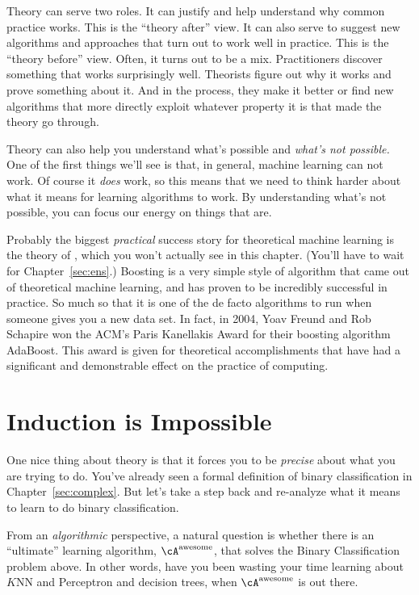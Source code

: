 Theory can serve two roles.  It can justify and help understand why
common practice works.  This is the ``theory after'' view.  It can
also serve to suggest new algorithms and approaches that turn out to
work well in practice.  This is the ``theory before'' view.  Often, it
turns out to be a mix.  Practitioners discover something that works
surprisingly well.  Theorists figure out why it works and prove
something about it.  And in the process, they make it better or find
new algorithms that more directly exploit whatever property it is that
made the theory go through.

Theory can also help you understand what's possible and \emph{what's
  not possible.}  One of the first things we'll see is that, in
general, machine learning can not work.  Of course it \emph{does}
work, so this means that we need to think harder about what it means
for learning algorithms to work.  By understanding what's not
possible, you can focus our energy on things that are.

Probably the biggest \emph{practical} success story for theoretical
machine learning is the theory of , which you won't
actually see in this chapter.  (You'll have to wait for
Chapter~\ref{sec:ens}.)  Boosting is a very simple style of algorithm
that came out of theoretical machine learning, and has proven to be
incredibly successful in practice.  So much so that it is one of the
de facto algorithms to run when someone gives you a new data set.  In
fact, in 2004, Yoav Freund and Rob Schapire won the ACM's Paris
Kanellakis Award for their boosting algorithm AdaBoost.  This award is
given for theoretical accomplishments that have had a significant and
demonstrable effect on the practice of computing.

\section{Induction is Impossible}

One nice thing about theory is that it forces you to be \emph{precise}
about what you are trying to do.  You've already seen a formal
definition of binary classification in Chapter~\ref{sec:complex}.  But
let's take a step back and re-analyze what it means to learn to do
binary classification.

From an \emph{algorithmic} perspective, a natural question is whether
there is an ``ultimate'' learning algorithm, $\cA^{\text{awesome}}$,
that solves the Binary Classification problem above.  In other words,
have you been wasting your time learning about $K$NN and Perceptron
and decision trees, when $\cA^{\text{awesome}}$ is out there.

